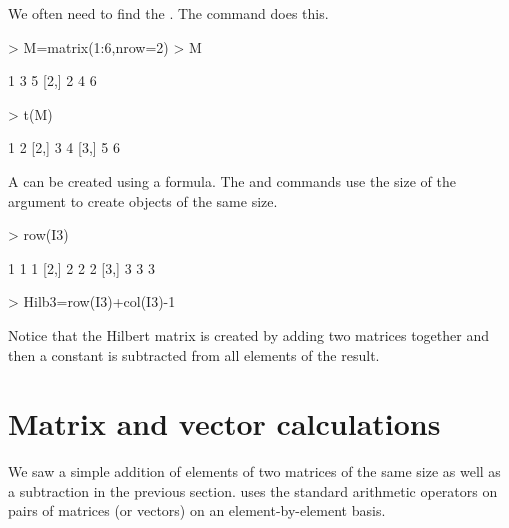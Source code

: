 We often need to find the . The  command does this.
\begin{Schunk}
\begin{Sinput}
> M=matrix(1:6,nrow=2)
> M
\end{Sinput}
\begin{Soutput}
     [,1] [,2] [,3]
[1,]    1    3    5
[2,]    2    4    6
\end{Soutput}
\begin{Sinput}
> t(M)
\end{Sinput}
\begin{Soutput}
     [,1] [,2]
[1,]    1    2
[2,]    3    4
[3,]    5    6
\end{Soutput}
\end{Schunk}

A  can be created using a formula. The  and  commands use the size of the argument to create objects of the same size.
\begin{Schunk}
\begin{Sinput}
> row(I3)
\end{Sinput}
\begin{Soutput}
     [,1] [,2] [,3]
[1,]    1    1    1
[2,]    2    2    2
[3,]    3    3    3
\end{Soutput}
\begin{Sinput}
> Hilb3=row(I3)+col(I3)-1
\end{Sinput}
\end{Schunk}
Notice that the Hilbert matrix is created by adding two matrices together and then a constant is subtracted from all elements of the result.

\section{Matrix and vector calculations}

We saw a simple addition of elements of two matrices of the same size as well as a subtraction in the previous section. \R{} uses the standard arithmetic operators on pairs of matrices (or vectors) on an element-by-element basis. 

